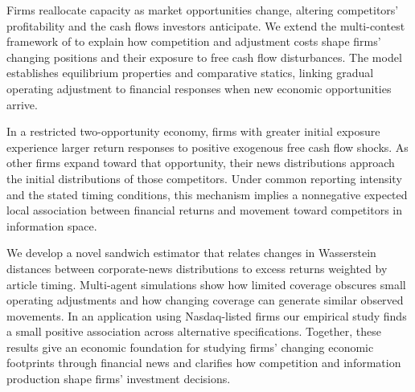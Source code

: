 Firms reallocate capacity as market opportunities change, altering competitors'
profitability and the cash flows investors anticipate.
We extend the multi-contest framework of
\citet{xu_zenou_zhou_conflict_2022} to explain how competition and adjustment
costs shape firms' changing positions and their exposure to free cash flow
disturbances.
The model establishes equilibrium properties and comparative statics, linking
gradual operating adjustment to financial responses when new economic
opportunities arrive.

In a restricted two-opportunity economy, firms with greater initial exposure
experience larger return responses to positive exogenous free cash flow shocks.
As other firms expand toward that opportunity, their news distributions
approach the initial distributions of those competitors.
Under common reporting intensity and the stated timing conditions, this
mechanism implies a nonnegative expected local association between financial
returns and movement toward competitors in information space.

We develop a novel sandwich estimator that relates changes in Wasserstein
distances between
corporate-news distributions to excess returns weighted by article timing.
Multi-agent simulations show how limited coverage obscures small operating
adjustments and how changing coverage can generate similar observed movements.
In an application using Nasdaq-listed firms our empirical study finds a
small positive association across alternative specifications.
Together, these results give an economic foundation for studying firms'
changing economic footprints through financial news and clarifies how competition
and information production shape firms' investment decisions.
